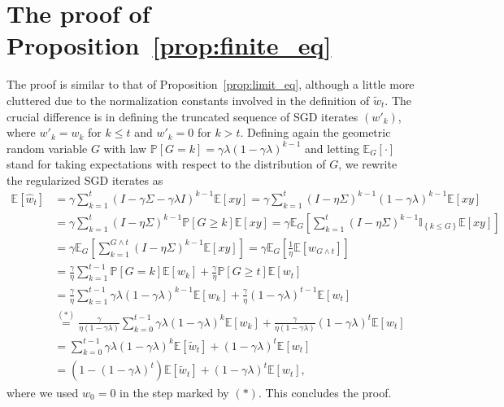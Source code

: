 \documentclass[final,12pt]{colt2018} %
\newcommand{\II}[1]{\mathbb{I}_{\left\{#1\right\}}}
\newcommand{\PP}[1]{\mathbb{P}\left[#1\right]}
\newcommand{\EE}[1]{\mathbb{E}\left[#1\right]}
\newcommand{\EEG}[1]{\mathbb{E}_G\left[#1\right]}
\newcommand{\pa}[1]{\left(#1\right)}
\newcommand{\bpa}[1]{\bigl(#1\bigr)}
\newcommand{\wh}{\widehat}
\newcommand{\wt}{\widetilde}
\newcommand{\tw}{\wt{w}}
\newcommand{\hw}{\wh{w}}
\begin{document}


\appendix

\section{The proof of Proposition~\ref{prop:finite_eq}}\label{app:exp}
The proof is similar to that of Proposition~\ref{prop:limit_eq}, although a little more cluttered due to the normalization constants 
involved in the definition of $\tw_t$. The crucial difference is in defining the truncated sequence of SGD iterates $\pa{w'_k}$, where 
$w'_k = w_k$ for $k\le t$ and $w'_k = 0$ for $k>t$.
Defining again the geometric random variable $G$ with law $\PP{G=k} = 
\gamma \lambda \pa{1-\gamma \lambda}^{k-1}$ and letting $\EEG{\cdot}$ stand for taking expectations with respect to the 
distribution of $G$, we rewrite the regularized SGD iterates as
\begin{align*}
 \EE{\hw_t} &= \gamma \sum_{k=1}^t \pa{I - \gamma \Sigma - \gamma \lambda I}^{k-1} \EE{xy}
 = \gamma \sum_{k=1}^t \pa{I - \eta \Sigma}^{k-1} (1-\gamma\lambda)^{k-1} \EE{xy}
 \\
 &= \gamma \sum_{k=1}^t \pa{I - \eta \Sigma}^{k-1} \PP{G \ge k} \EE{xy} = \gamma \EEG{\sum_{k=1}^t \pa{I - \eta \Sigma}^{k-1} 
\II{k\le G} \EE{xy}}
 \\
 &= \gamma \EEG{\sum_{k=1}^{G\wedge t} \pa{I - \eta \Sigma}^{k-1} \EE{xy}} = \gamma \EEG{\frac{1}{\eta}\EE{w_{G\wedge t}}} 
 \\
 &= \frac{\gamma}{\eta} \sum_{k=1}^{t-1} \PP{G = k} \EE{w_k} + \frac{\gamma}{\eta} \PP{G \ge t} \EE{w_t}
 \\
 &= \frac{\gamma}{\eta} \sum_{k=1}^{t-1} \gamma \lambda (1-\gamma\lambda)^{k-1} \EE{w_k} + \frac{\gamma}{\eta} (1-\gamma\lambda)^{t-1} 
\EE{w_t}
 \\
 &\stackrel{(*)}{=} \frac{\gamma}{\eta(1-\gamma\lambda)} \sum_{k=0}^{t-1} \gamma \lambda (1-\gamma\lambda)^{k} \EE{w_k} + 
\frac{\gamma}{\eta (1-\gamma\lambda)} (1-\gamma\lambda)^{t} 
\EE{w_t}
 \\
 &= \sum_{k=0}^{t-1} \gamma \lambda (1-\gamma\lambda)^{k} \EE{\tw_t} + (1-\gamma\lambda)^{t} 
\EE{w_t}
\\
& = \pa{1 - \pa{1-\gamma\lambda}^t} \EE{\tw_t} + (1-\gamma\lambda)^{t} \EE{w_t},
\end{align*}
where we used $w_0 = 0$ in the step marked by $(*)$. This 
concludes the proof.
\end{document}
